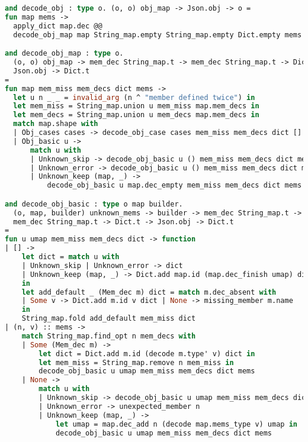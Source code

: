 \documentclass[nolinenum]{jfp}
\begin{document}
\begin{lstlisting}[language=ocaml]
and decode_obj : type o. (o, o) obj_map -> Json.obj -> o =
fun map mems ->
  apply_dict map.dec @@
  decode_obj_map map String_map.empty String_map.empty Dict.empty mems

and decode_obj_map : type o.
  (o, o) obj_map -> mem_dec String_map.t -> mem_dec String_map.t -> Dict.t ->
  Json.obj -> Dict.t
=
fun map mem_miss mem_decs dict mems ->
  let u n _ _ = invalid_arg (n ^ "member defined twice") in
  let mem_miss = String_map.union u mem_miss map.mem_decs in
  let mem_decs = String_map.union u mem_decs map.mem_decs in
  match map.shape with
  | Obj_cases cases -> decode_obj_case cases mem_miss mem_decs dict [] mems
  | Obj_basic u ->
      match u with
      | Unknown_skip -> decode_obj_basic u () mem_miss mem_decs dict mems
      | Unknown_error -> decode_obj_basic u () mem_miss mem_decs dict mems
      | Unknown_keep (map, _) ->
          decode_obj_basic u map.dec_empty mem_miss mem_decs dict mems

and decode_obj_basic : type o map builder.
  (o, map, builder) unknown_mems -> builder -> mem_dec String_map.t ->
  mem_dec String_map.t -> Dict.t -> Json.obj -> Dict.t
=
fun u umap mem_miss mem_decs dict -> function
| [] ->
    let dict = match u with
    | Unknown_skip | Unknown_error -> dict
    | Unknown_keep (map, _) -> Dict.add map.id (map.dec_finish umap) dict
    in
    let add_default _ (Mem_dec m) dict = match m.dec_absent with
    | Some v -> Dict.add m.id v dict | None -> missing_member m.name
    in
    String_map.fold add_default mem_miss dict
| (n, v) :: mems ->
    match String_map.find_opt n mem_decs with
    | Some (Mem_dec m) ->
        let dict = Dict.add m.id (decode m.type' v) dict in
        let mem_miss = String_map.remove n mem_miss in
        decode_obj_basic u umap mem_miss mem_decs dict mems
    | None ->
        match u with
        | Unknown_skip -> decode_obj_basic u umap mem_miss mem_decs dict mems
        | Unknown_error -> unexpected_member n
        | Unknown_keep (map, _) ->
            let umap = map.dec_add n (decode map.mems_type v) umap in
            decode_obj_basic u umap mem_miss mem_decs dict mems


\end{lstlisting}
\end{document}
